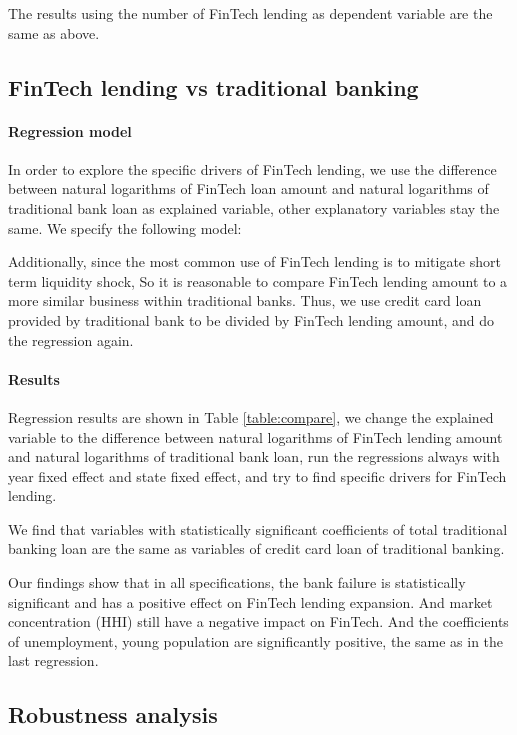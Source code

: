 \documentclass[11pt, a4paper, leqno]{article}
\begin{document}
The results using the number of FinTech lending as dependent variable are the same as above. 

\subsection{FinTech lending vs traditional banking}
\paragraph{Regression model} 
In order to explore the specific drivers of FinTech lending, we use the difference between natural logarithms of FinTech loan amount and natural logarithms of traditional bank loan as explained variable, other explanatory variables stay the same. We specify the following model:


Additionally, since the most common use of FinTech lending is to mitigate short term liquidity shock, So it is reasonable to compare FinTech lending amount to a more similar business within traditional banks. Thus, we use credit card loan provided by traditional bank to be divided by FinTech lending amount, and do the regression again.  

\paragraph{Results}
Regression results are shown in Table \ref{table:compare}, we change the explained variable to the difference between natural logarithms of FinTech lending amount and natural logarithms of traditional bank loan, run the regressions always with year fixed effect and state fixed effect, and try to find specific drivers for FinTech lending. 

We find that variables with statistically significant coefficients of total traditional banking loan are the same as variables of credit card loan of traditional banking. 

Our findings show that in all specifications, the bank failure is statistically significant and has a positive effect on FinTech lending expansion. And market concentration (HHI) still have a negative impact on FinTech. And the coefficients of unemployment, young population are significantly positive, the same as in the last regression.


\subsection{Robustness analysis}
\end{document}
